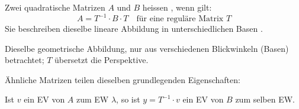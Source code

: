 
\begin{defbox}
Zwei quadratische Matrizen $A$ und $B$ heissen , wenn gilt:
\[ A = T^{-1} \cdot B \cdot T \quad \text{für eine reguläre Matrix } T \]
Sie beschreiben dieselbe lineare Abbildung in unterschiedlichen Basen .

 Dieselbe geometrische Abbildung, nur aus verschiedenen Blickwinkeln (Basen) betrachtet; $T$ übersetzt die Perspektive.
\end{defbox}
\begin{defbox}
Ähnliche Matrizen teilen dieselben grundlegenden Eigenschaften:
  \begin{ZSFlist}
  \end{ZSFlist}
Ist $v$ ein EV von $A$ zum EW $\lambda$, so ist $y = T^{-1} \cdot v$ ein EV von $B$ zum selben EW.
\end{defbox}
